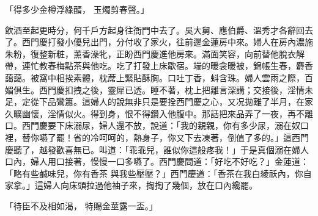 \begin{showcontents}{}
「得多少金樽浮綠醑，  玉燭剪春聲。」

飲酒至起更時分，何千戶方起身往衙門中去了。吳大舅、應伯爵、溫秀才各辭回去了。西門慶打發小優兒出門，分付收了家火，往前邊金蓮房中來。婦人在房內濃施朱粉，復整新粧，薰香澡牝，正盼西門慶進他房來。滿面笑容，向前替他脫衣解帶，連忙教春梅點茶與他吃。吃了打發上床歇宿。端的暖衾暖被，錦帳生春，麝香藹藹。被窩中相挨素體，枕蓆上緊貼酥胸。口吐丁香，蚪含珠。婦人雲雨之際，百媚俱生。西門慶扣拽之後，靈犀已透。睡不著，枕上把離言深講；交接後，淫情未足，定從下品鸞簫。這婦人的說無非只是要拴西門慶之心，又况拋離了半月，在家久曠幽懷，淫情似火。得到身，恨不得鑽入他腹中。那話把來品弄了一夜，再不離口。西門慶要下床溺尿，婦人還不放，說道：「我的親親，你有多少尿，溺在奴口裡，替你嚥了罷！省的冷呵呵的，熱身子，你又下去凍著，倒值了多的。」這西門慶聽了，越發歡喜無已。叫道：「乖乖兒，誰似你這般疼我！」于是真個溺在婦人口內，婦人用口接著，慢慢一口多嚥了。西門慶問道：「好吃不好吃？」金蓮道：「略有些鹹味兒，你有香茶 與我些壓壓？」西門慶道：「香茶在我白綾祅內，你自家拿。」這婦人向床頭拉過他袖子來，掏掏了幾個，放在口內纔罷。

「待臣不及相如渴，  特賜金莖露一盃。」


\end{showcontents}
